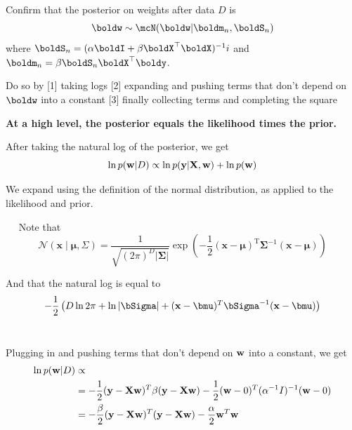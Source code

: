 \documentclass[submit]{harvardml}
\newenvironment{answer}{%
    \color{answergreen}\bf}
  {%
  }
\begin{document}
\begin{enumerate}
Confirm that the posterior on weights after data $D$ is 
$$\boldw\sim\mcN(\boldw|\boldm_n,\boldS_n)$$
where $\boldS_n =(\alpha\boldI+\beta\boldX^\top\boldX)^{-1}i$ and 
$\boldm_n=\beta\boldS_n\boldX^\top\boldy$.

Do so by [1] taking logs 
[2] expanding and pushing terms that don't depend on $\boldw$ into a constant
[3] finally collecting terms and completing the square


\begin{answer}
    At a high level, the posterior equals the likelihood times
    the prior. 
    
    After taking the natural log of the posterior, 
    we get $$ \ln p(\mathbf{w}|D) \propto \ln p(\mathbf{y}|\mathbf{X},\mathbf{w}) + \ln p(\mathbf{w}) $$

    We expand using the definition of the normal distribution, as applied to
    the likelihood and prior. 

    ~~ Note that
    \begin{equation}
     \mathcal{N}(\boldsymbol x \mid \boldsymbol\mu, \Sigma)
             = \frac{1}{\sqrt{(2\pi)^D|\boldsymbol\Sigma|}}  \exp\left(-\frac 1 2 ({\mathbf x}-{\boldsymbol\mu})^\mathrm{T}{\boldsymbol\Sigma}^{-1}({\mathbf x}-{\boldsymbol\mu})\right)
    \end{equation}

    And that the natural log is equal to 
    \begin{equation}
     - \frac{1}{2} \left( D \ln2\pi + \ln|\bSigma| + (\bx - \bmu)^T
        \bSigma^{-1} (\bx-\bmu) \right) \label{lnNormal}
    \end{equation}
   ~~ 
    
    Plugging in and pushing terms that don't depend on $\mathbf{w}$ into a constant, we get 
    \begin{align*}
        \ln p(\mathbf{w}|D) &\propto  \\
        &=-\frac{1}{2} (\mathbf{y}-\mathbf{X}\mathbf{w})^T \beta(\mathbf{y}-\mathbf{X}\mathbf{w}) - \frac{1}{2}
        (\mathbf{w}-0)^T(\alpha^{-1}I)^{-1}(\mathbf{w}-0) \\
        &=- \frac{\beta}{2}(\mathbf{y}-\mathbf{X}\mathbf{w})^T(\mathbf{y}-\mathbf{X}\mathbf{w}) - \frac{\alpha}{2}\mathbf{w}^T\mathbf{w}
   \end{align*}


\end{answer}
\end{enumerate}
\end{document}
